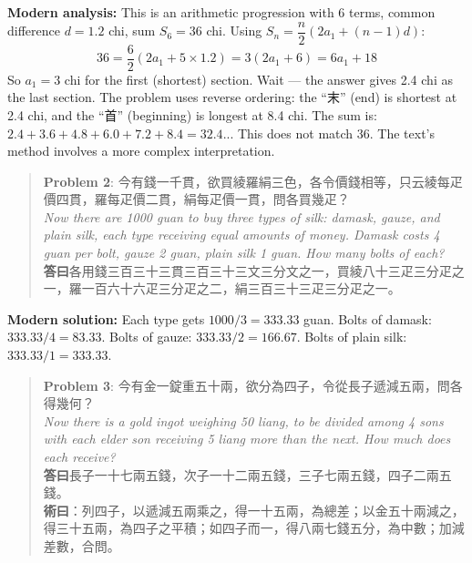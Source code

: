 \documentclass[11pt,a4paper]{article}
\newenvironment{vol3problembox}{%
  \begin{quote}
  \itshape
  \color{vol3color}
}{%
  \end{quote}
}
\begin{document}
\textbf{Modern analysis:} This is an arithmetic progression with 6 terms, common difference $d = 1.2$ chi, sum $S_6 = 36$ chi. Using $S_n = \dfrac{n}{2}(2a_1 + (n-1)d)$:
$$36 = \frac{6}{2}(2a_1 + 5 \times 1.2) = 3(2a_1 + 6) = 6a_1 + 18$$
So $a_1 = 3$ chi for the first (shortest) section. Wait --- the answer gives 2.4 chi as the last section. The problem uses reverse ordering: the ``末'' (end) is shortest at 2.4 chi, and the ``首'' (beginning) is longest at 8.4 chi. The sum is: $2.4 + 3.6 + 4.8 + 6.0 + 7.2 + 8.4 = 32.4$... This does not match 36. The text's method involves a more complex interpretation.

\vspace{0.3cm}

\begin{vol3problembox}
\textbf{Problem 2}: 今有錢一千貫，欲買綾羅絹三色，各令價錢相等，只云綾每疋價四貫，羅每疋價二貫，絹每疋價一貫，問各買幾疋？\\[0.2cm]
\textit{Now there are 1000 guan to buy three types of silk: damask, gauze, and plain silk, each type receiving equal amounts of money. Damask costs 4 guan per bolt, gauze 2 guan, plain silk 1 guan. How many bolts of each?}\\[0.2cm]
\textbf{答曰}各用錢三百三十三貫三百三十三文三分文之一，買綾八十三疋三分疋之一，羅一百六十六疋三分疋之二，絹三百三十三疋三分疋之一。
\end{vol3problembox}

\textbf{Modern solution:} Each type gets $1000/3 = 333.33$ guan. Bolts of damask: $333.33/4 = 83.33$. Bolts of gauze: $333.33/2 = 166.67$. Bolts of plain silk: $333.33/1 = 333.33$.

\vspace{0.3cm}

\begin{vol3problembox}
\textbf{Problem 3}: 今有金一錠重五十兩，欲分為四子，令從長子遞減五兩，問各得幾何？\\[0.2cm]
\textit{Now there is a gold ingot weighing 50 liang, to be divided among 4 sons with each elder son receiving 5 liang more than the next. How much does each receive?}\\[0.2cm]
\textbf{答曰}長子一十七兩五錢，次子一十二兩五錢，三子七兩五錢，四子二兩五錢。\\[0.2cm]
\textbf{術曰}：列四子，以遞減五兩乘之，得一十五兩，為總差；以金五十兩減之，得三十五兩，為四子之平積；如四子而一，得八兩七錢五分，為中數；加減差數，合問。
\end{vol3problembox}
\end{document}
